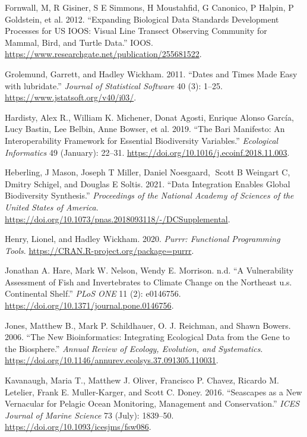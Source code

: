 \documentclass[
]{book}
\newlength{\cslhangindent}
\newlength{\cslentryspacingunit} %
\newenvironment{CSLReferences}[2] %
 {%
  \setlength{\parindent}{0pt}
  \ifodd #1
  \let\oldpar\par
  \def\par{\hangindent=\cslhangindent\oldpar}
  \fi
  \setlength{\parskip}{#2\cslentryspacingunit}
 }%
 {}
\begin{document}
\begin{CSLReferences}{1}{0}
\leavevmode{}%
Fornwall, M, R Gisiner, S E Simmons, H Moustahfid, G Canonico, P Halpin, P Goldstein, et al. 2012. {``Expanding Biological Data Standards Development Processes for US IOOS: Visual Line Transect Observing Community for Mammal, Bird, and Turtle Data.''} IOOS. \url{https://www.researchgate.net/publication/255681522}.

\leavevmode{}%
Grolemund, Garrett, and Hadley Wickham. 2011. {``Dates and Times Made Easy with {lubridate}.''} \emph{Journal of Statistical Software} 40 (3): 1--25. \url{https://www.jstatsoft.org/v40/i03/}.

\leavevmode{}%
Hardisty, Alex R., William K. Michener, Donat Agosti, Enrique Alonso García, Lucy Bastin, Lee Belbin, Anne Bowser, et al. 2019. {``The Bari Manifesto: An Interoperability Framework for Essential Biodiversity Variables.''} \emph{Ecological Informatics} 49 (January): 22--31. \url{https://doi.org/10.1016/j.ecoinf.2018.11.003}.

\leavevmode{}%
Heberling, J Mason, Joseph T Miller, Daniel Noesgaard, Scott B Weingart C, Dmitry Schigel, and Douglas E Soltis. 2021. {``Data Integration Enables Global Biodiversity Synthesis.''} \emph{Proceedings of the National Academy of Sciences of the United States of America}. \url{https://doi.org/10.1073/pnas.2018093118/-/DCSupplemental}.

\leavevmode{}%
Henry, Lionel, and Hadley Wickham. 2020. \emph{Purrr: Functional Programming Tools}. \url{https://CRAN.R-project.org/package=purrr}.

\leavevmode{}%
Jonathan A. Hare, Mark W. Nelson, Wendy E. Morrison. n.d. {``A Vulnerability Assessment of Fish and Invertebrates to Climate Change on the Northeast u.s. Continental Shelf.''} \emph{PLoS ONE} 11 (2): e0146756. \url{https://doi.org/10.1371/journal.pone.0146756}.

\leavevmode{}%
Jones, Matthew B., Mark P. Schildhauer, O. J. Reichman, and Shawn Bowers. 2006. {``The New Bioinformatics: Integrating Ecological Data from the Gene to the Biosphere.''} \emph{Annual Review of Ecology, Evolution, and Systematics}. \url{https://doi.org/10.1146/annurev.ecolsys.37.091305.110031}.

\leavevmode{}%
Kavanaugh, Maria T., Matthew J. Oliver, Francisco P. Chavez, Ricardo M. Letelier, Frank E. Muller-Karger, and Scott C. Doney. 2016. {``Seascapes as a New Vernacular for Pelagic Ocean Monitoring, Management and Conservation.''} \emph{ICES Journal of Marine Science} 73 (July): 1839--50. \url{https://doi.org/10.1093/icesjms/fsw086}.


\end{CSLReferences}
\end{document}
